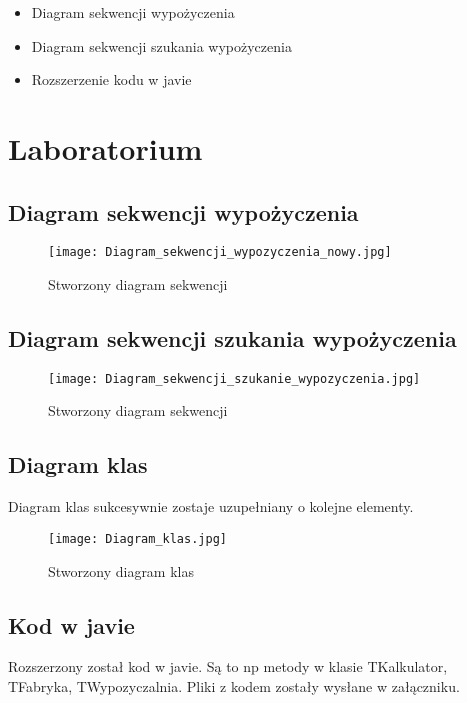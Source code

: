 \documentclass{article}
\begin{document}
	\begin{itemize}
		\item Diagram sekwencji wypożyczenia
		\item Diagram sekwencji szukania wypożyczenia
		\item Rozszerzenie kodu w javie
	\end{itemize}
	\newpage
	\section{Laboratorium}
	\subsection{ Diagram sekwencji wypożyczenia}
\begin{figure}[!ht]
	\centering
	\texttt{[image: Diagram\_sekwencji\_wypozyczenia\_nowy.jpg]}
	\caption{Stworzony diagram sekwencji}
	\label{fig:obrazek 1}
\end{figure}
	\newpage
	\subsection{Diagram sekwencji szukania wypożyczenia }
	\begin{figure}[!ht]
	\centering
\texttt{[image: Diagram\_sekwencji\_szukanie\_wypozyczenia.jpg]}
\caption{Stworzony diagram sekwencji}
\label{fig:obrazek 2}
	\end{figure}
\subsection{Diagram klas}
Diagram klas sukcesywnie zostaje uzupełniany o kolejne elementy.
	\begin{figure}[!ht]
	\centering
	\texttt{[image: Diagram\_klas.jpg]}
	\caption{Stworzony diagram klas}
	\label{fig:obrazek 3}
\end{figure}
\subsection{Kod w javie}
Rozszerzony został kod w javie. Są to np metody w klasie TKalkulator, TFabryka, TWypozyczalnia. Pliki z kodem zostały wysłane w załączniku.
\end{document}

